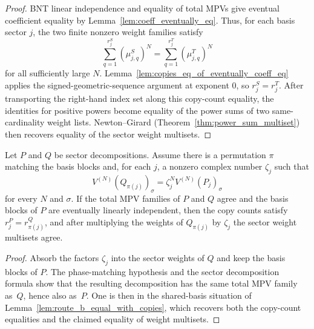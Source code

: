\begin{proof}
	\leanok
	BNT linear independence and equality of total MPVs give eventual
	coefficient equality by Lemma~\ref{lem:coeff_eventually_eq}.  Thus, for each
	basis sector \(j\), the two finite nonzero weight families satisfy
	\[
		\sum_{q=1}^{r_j^S}(\mu_{j,q}^S)^N
		=
		\sum_{q=1}^{r_j^T}(\mu_{j,q}^T)^N
	\]
	for all sufficiently large \(N\).  Lemma~\ref{lem:copies_eq_of_eventually_coeff_eq}
	applies the signed-geometric-sequence argument at exponent \(0\), so
	\(r_j^S=r_j^T\).  After transporting the right-hand index set along this
	copy-count equality, the identities for positive powers become equality of
	the power sums of two same-cardinality weight lists.  Newton--Girard
	(Theorem~\ref{thm:power_sum_multiset}) then recovers equality of the sector
	weight multisets.
\end{proof}

\begin{lemma}%
\label{lem:route_b_hetero_phase_match_copies}
	\leanok
	Let $P$ and $Q$ be sector decompositions. Assume there is a permutation
	$\pi$ matching the basis blocks and, for each $j$, a nonzero complex
	number $\zeta_j$ such that
	\[
		V^{(N)}(Q_{\pi(j)})_\sigma = \zeta_j^N V^{(N)}(P_j)_\sigma
	\]
	for every $N$ and $\sigma$. If the total MPV families of $P$ and $Q$
	agree and the basis blocks of $P$ are eventually linearly independent,
	then the copy counts satisfy $r_j^P=r_{\pi(j)}^Q$, and after multiplying
	the weights of $Q_{\pi(j)}$ by $\zeta_j$ the sector weight multisets agree.
\end{lemma}

\begin{proof}
	\leanok
	Absorb the factors $\zeta_j$ into the sector weights of $Q$ and keep the
	basis blocks of $P$. The phase-matching hypothesis and the sector
	decomposition formula show that the resulting decomposition has the same
	total MPV family as~$Q$, hence also as~$P$. One is then in the
	shared-basis situation of Lemma~\ref{lem:route_b_equal_with_copies},
	which recovers both the copy-count equalities and the claimed equality of
	weight multisets.
\end{proof}

